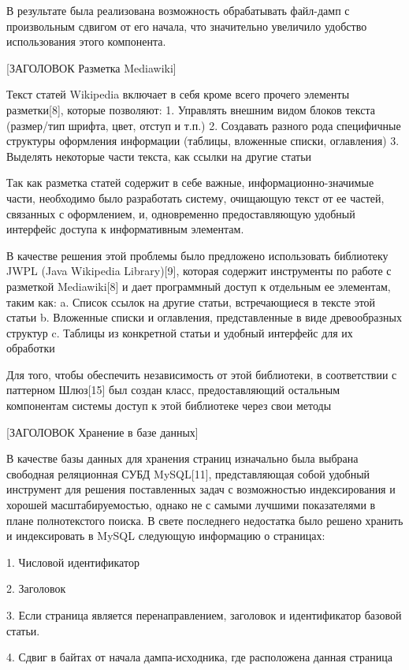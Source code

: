 В результате была реализована возможность обрабатывать файл-дамп с произвольным
сдвигом от его начала, что значительно увеличило удобство использования этого компонента.  

[ЗАГОЛОВОК Разметка Mediawiki]

Текст статей Wikipedia включает в себя кроме всего прочего элементы разметки[8], которые позволяют:
1. Управлять внешним видом блоков текста (размер/тип шрифта, цвет, отступ и т.п.)
2. Создавать разного рода специфичные структуры оформления информации (таблицы, вложенные списки, оглавления)
3. Выделять некоторые части текста, как ссылки на другие статьи

Так как разметка статей содержит в себе важные, информационно-значимые части, 
необходимо было разработать систему, очищающую текст от ее частей, связанных с оформлением,
и, одновременно предоставляющую удобный интерфейс доступа к информативным элементам.

В качестве решения этой проблемы было предложено использовать библиотеку 
JWPL (Java Wikipedia Library)[9], которая содержит инструменты по работе с разметкой 
Mediawiki[8] и дает программный доступ к отдельным ее элементам, таким как:
a. Список ссылок на другие статьи, встречающиеся в тексте этой статьи
b. Вложенные списки и оглавления, представленные в виде древообразных структур
c. Таблицы из конкретной статьи и удобный интерфейс для их обработки

Для того, чтобы обеспечить независимость от этой библиотеки, в соответствии
с паттерном Шлюз[15] был создан класс, предоставляющий остальным компонентам системы
доступ к этой библиотеке через свои методы

[ЗАГОЛОВОК Хранение в базе данных]

В качестве базы данных для хранения страниц изначально была выбрана свободная реляционная 
СУБД MySQL[11], представляющая собой удобный инструмент для решения поставленных 
задач с возможностью индексирования и хорошей масштабируемостью, однако не с самыми
лучшими показателями в плане полнотекстого поиска. В свете последнего недостатка было 
решено хранить и индексировать в MySQL следующую информацию о страницах:

1. Числовой идентификатор

2. Заголовок

3. Если страница является перенаправлением, заголовок и идентификатор  базовой статьи.

4. Сдвиг в байтах от начала дампа-исходника, где расположена данная страница

